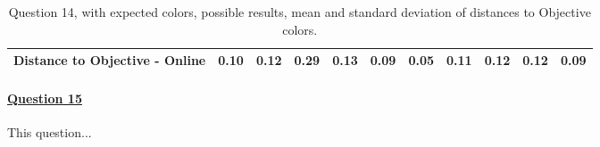 \begin{table}[H]
{\begin{tabular}{lccccccccccccc}
    \multicolumn{4}{l}{Distance to Objective - Online}                                                                                               & \multicolumn{1}{|c}{0.10}        & \multicolumn{1}{c|}{0.12}    & \multicolumn{1}{|c}{0.29}        & \multicolumn{1}{c|}{0.13}    & \multicolumn{1}{|c}{\textbf{0.09}}       & \multicolumn{1}{c|}{0.05}    & \multicolumn{1}{|c}{0.11}        & \multicolumn{1}{c|}{0.12}    & \multicolumn{1}{|c}{0.12}       & \multicolumn{1}{c|}{0.09}    \\ \hline
    \end{tabular}}
  \caption[Question 14, with expected Results.]{Question 14, with expected colors, possible results, mean and standard deviation of distances to Objective colors.}
  \label{table:lab_q14_expected}
\end{table}
%
\paragraph{\ul{Question 15}}
%
This question...
%
